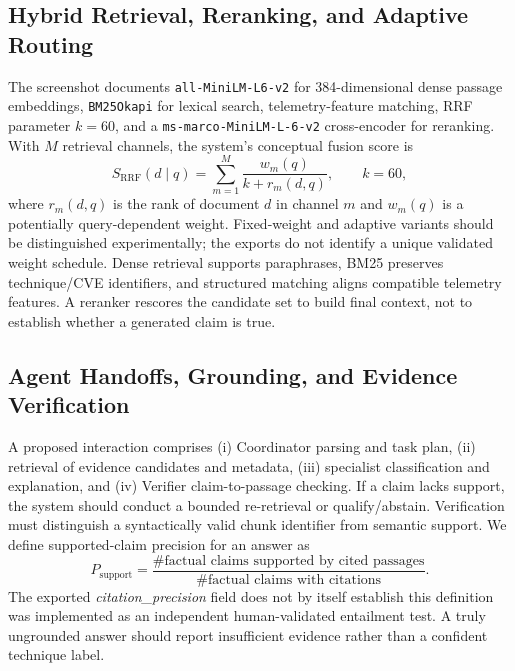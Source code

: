 \documentclass[journal,twoside]{IEEEtran}
\begin{document}
\subsection{Hybrid Retrieval, Reranking, and Adaptive Routing}
The screenshot documents \texttt{all-MiniLM-L6-v2} for 384-dimensional dense passage embeddings, \texttt{BM25Okapi} for lexical search, telemetry-feature matching, RRF parameter $k=60$, and a \texttt{ms-marco-MiniLM-L-6-v2} cross-encoder for reranking. With $M$ retrieval channels, the system's conceptual fusion score is
\begin{equation}
S_{\mathrm{RRF}}(d\mid q)=\sum_{m=1}^{M}\frac{w_m(q)}{k+r_m(d,q)},\qquad k=60,
\label{eq:rrf}
\end{equation}
where $r_m(d,q)$ is the rank of document $d$ in channel $m$ and $w_m(q)$ is a potentially query-dependent weight. Fixed-weight and adaptive variants should be distinguished experimentally; the exports do not identify a unique validated weight schedule. Dense retrieval supports paraphrases, BM25 preserves technique/CVE identifiers, and structured matching aligns compatible telemetry features. A reranker rescores the candidate set to build final context, not to establish whether a generated claim is true.

\subsection{Agent Handoffs, Grounding, and Evidence Verification}
A proposed interaction comprises (i) Coordinator parsing and task plan, (ii) retrieval of evidence candidates and metadata, (iii) specialist classification and explanation, and (iv) Verifier claim-to-passage checking. If a claim lacks support, the system should conduct a bounded re-retrieval or qualify/abstain. Verification must distinguish a syntactically valid chunk identifier from semantic support. We define supported-claim precision for an answer as
\begin{equation}
P_{\mathrm{support}}=\frac{\#\text{factual claims supported by cited passages}}{\#\text{factual claims with citations}}.
\end{equation}
The exported \emph{citation\_precision} field does not by itself establish this definition was implemented as an independent human-validated entailment test. A truly ungrounded answer should report insufficient evidence rather than a confident technique label.
\end{document}

